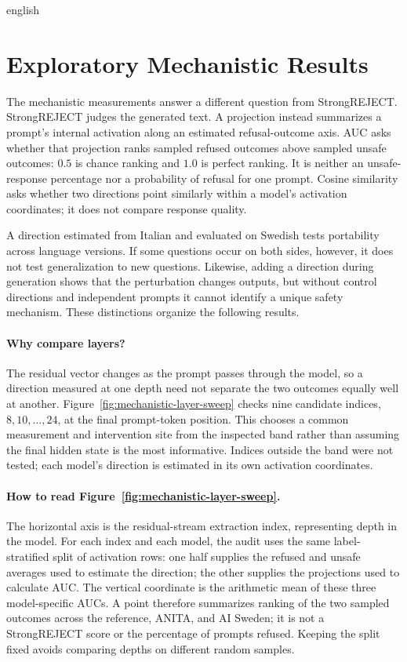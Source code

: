 \begin{otherlanguage*}{english}
\section{Exploratory Mechanistic Results}
\label{sec:mechanistic-results}
\setcounter{secnumdepth}{3}

The mechanistic measurements answer a different question from StrongREJECT. StrongREJECT judges the generated text. A projection instead summarizes a prompt's internal activation along an estimated refusal-outcome axis. AUC asks whether that projection ranks sampled refused outcomes above sampled unsafe outcomes: $0.5$ is chance ranking and $1.0$ is perfect ranking. It is neither an unsafe-response percentage nor a probability of refusal for one prompt. Cosine similarity asks whether two directions point similarly within a model's activation coordinates; it does not compare response quality.

A direction estimated from Italian and evaluated on Swedish tests portability across language versions. If some questions occur on both sides, however, it does not test generalization to new questions. Likewise, adding a direction during generation shows that the perturbation changes outputs, but without control directions and independent prompts it cannot identify a unique safety mechanism. These distinctions organize the following results.

\paragraph*{Why compare layers?} The residual vector changes as the prompt passes through the model, so a direction measured at one depth need not separate the two outcomes equally well at another. Figure~\ref{fig:mechanistic-layer-sweep} checks nine candidate indices, $8,10,\ldots,24$, at the final prompt-token position. This chooses a common measurement and intervention site from the inspected band rather than assuming the final hidden state is the most informative. Indices outside the band were not tested; each model's direction is estimated in its own activation coordinates.

\paragraph*{How to read Figure~\ref{fig:mechanistic-layer-sweep}.} The horizontal axis is the residual-stream extraction index, representing depth in the model. For each index and each model, the audit uses the same label-stratified split of activation rows: one half supplies the refused and unsafe averages used to estimate the direction; the other supplies the projections used to calculate AUC. The vertical coordinate is the arithmetic mean of these three model-specific AUCs. A point therefore summarizes ranking of the two sampled outcomes across the reference, ANITA, and AI Sweden; it is not a StrongREJECT score or the percentage of prompts refused. Keeping the split fixed avoids comparing depths on different random samples.


\end{otherlanguage*}

